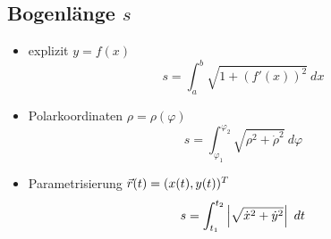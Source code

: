 \subsection{Bogenlänge \hfill $s\ $}
    \begin{itemize}
        \item explizit $y = f(x)$
            $$
                s = \int_a^b \sqrt{1 + \left( f'(x) \right)^2} \ dx
            $$
        \item Polarkoordinaten $\rho = \rho(\varphi)$
            $$
                s = \int_{\varphi_1}^{\varphi_2} \sqrt{\rho^2 + \dot{\rho}^2} \ d\varphi
            $$
        \item Parametrisierung $\vec{r}(t) = (x(t),y(t))^T$
            $$
                s = \int_{t_1}^{t_2} \left\lvert \sqrt{\dot{x}^2 + \dot{y}^2} \right\rvert \ dt
            $$
    \end{itemize}
